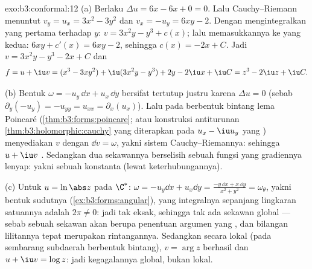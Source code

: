 \begin{solution}{exo:b3:conformal:12}
(a) Berlaku $\Delta u = 6x - 6x + 0 = 0$. Lalu Cauchy--Riemann menuntut
$v_y = u_x = 3x^2 - 3y^2$ dan $v_x = -u_y = 6xy - 2$.
Dengan mengintegralkan yang pertama terhadap $y$: $v = 3x^2y - y^3 + c(x)$;
lalu memasukkannya ke yang kedua: $6xy + c'(x) = 6xy - 2$, sehingga $c(x)
= -2x + C$. Jadi $v = 3x^2y - y^3 - 2x + C$ dan
\[
f = u + \iu v = (x^3 - 3xy^2) + \iu(3x^2y - y^3)
+ 2y - 2\iu x + \iu C = z^3 - 2\iu z + \iu C .
\]

(b) Bentuk $\omega = -u_y\,\dd x + u_x\,\dd y$ bersifat tertutup
justru karena $\Delta u = 0$ (sebab $\partial_y(-u_y) =
-u_{yy} = u_{xx} = \partial_x(u_x)$). Lalu pada  berbentuk
bintang lema Poincaré (\cref{thm:b3:forms:poincare}; atau
konstruksi antiturunan
\cref{thm:b3:holomorphic:cauchy} yang diterapkan pada
$u_x - \iu u_y$ yang ) menyediakan $v$ dengan $\dd v = \omega$, yakni
sistem Cauchy--Riemannya: sehingga $u + \iu v$ . Sedangkan dua
sekawannya berselisih sebuah fungsi yang gradiennya lenyap: yakni sebuah
konstanta (lewat keterhubungannya).

(c) Untuk $u = \ln\abs z$ pada $\C^*$: $\omega = -u_y\dd x +
u_x\dd y = \frac{-y\,\dd x + x\,\dd y}{x^2 + y^2} =
\omega_\theta$, yakni bentuk sudutnya
(\cref{ex:b3:forms:angular}), yang integralnya sepanjang lingkaran
satuannya adalah $2\pi \neq 0$: jadi tak eksak, sehingga tak ada sekawan
global --- sebab sebuah sekawan akan berupa penentuan
argumen yang , dan bilangan lilitannya tepat merupakan
rintangannya. Sedangkan secara lokal (pada sembarang subdaerah berbentuk bintang), $v =
\arg z$ berhasil dan $u + \iu v = \log z$: jadi kegagalannya
global, bukan lokal.
\end{solution}

